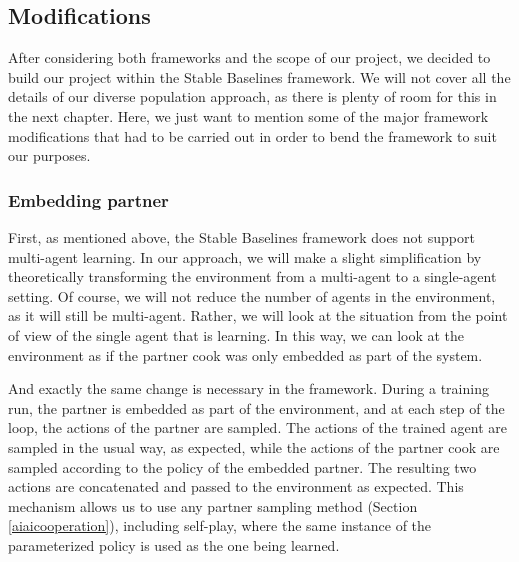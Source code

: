 \subsection{Modifications}
After considering both frameworks and the scope of our project, we decided to build our project within the Stable Baselines framework.
We will not cover all the details of our diverse population approach, as there is plenty of room for this in the next chapter.
Here, we just want to mention some of the major framework modifications that had to be carried out in order to bend the framework to suit our purposes.

\subsubsection*{Embedding partner}
First, as mentioned above, the Stable Baselines framework does not support multi-agent learning.
In our approach, we will make a slight simplification by theoretically transforming the environment from a multi-agent to a single-agent setting.
Of course, we will not reduce the number of agents in the environment, as it will still be multi-agent.
Rather, we will look at the situation from the point of view of the single agent that is learning. 
In this way, we can look at the environment as if the partner cook was only embedded as part of the system.

And exactly the same change is necessary in the framework.
During a training run, the partner is embedded as part of the environment, and at each step of the loop, the actions of the partner are sampled.
The actions of the trained agent are sampled in the usual way, as expected, while the actions of the partner cook are sampled according to the policy of the embedded partner.
The resulting two actions are concatenated and passed to the environment as expected.
This mechanism allows us to use any partner sampling method (Section \ref{aiaicooperation}), including self-play, where the same instance of the parameterized policy is used as the one being learned.



